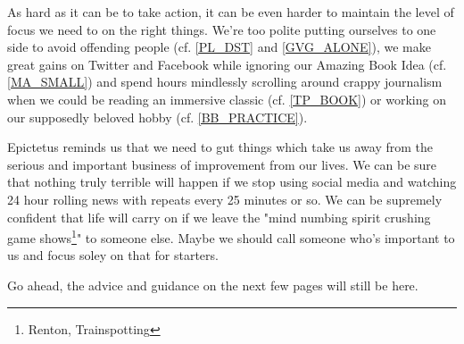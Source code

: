 \cleardoublepage

As hard as it can be to take action, it can be even harder to maintain the level of focus we need to on the right things. We're too polite putting ourselves to one side to avoid offending people (cf. \ref{PL_DST} and \ref{GVG_ALONE}), we make great gains on Twitter and Facebook while ignoring our Amazing Book Idea (cf. \ref{MA_SMALL}) and spend hours mindlessly scrolling around crappy journalism when we could be reading an immersive classic (cf. \ref{TP_BOOK}) or working on our supposedly beloved hobby (cf. \ref{BB_PRACTICE}).

Epictetus reminds us that we need to gut things which take us away from the serious and important business of improvement from our lives. We can be sure that nothing truly terrible will happen if we stop using social media and watching 24 hour rolling news with repeats every 25 minutes or so. We can be supremely confident that life will carry on if we leave the "mind numbing spirit crushing game shows\footnote{Renton, Trainspotting}" to someone else.
Maybe we should call someone who's important to us and focus soley on that for starters. 

Go ahead, the advice and guidance on the next few pages will still be here.

\clearpage
